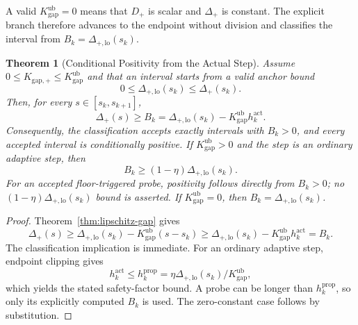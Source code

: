 \documentclass[11pt, a4paper]{article}
\newtheorem{theorem}{Theorem}[section]
\begin{document}
A valid $K_{\mathrm{gap}}^{\mathrm{ub}}=0$ means that $D_+$ is scalar and $\Delta_+$ is constant. The explicit branch therefore advances to the endpoint without division and classifies the interval from $B_k=\Delta_{+,\mathrm{lo}}(s_k)$.

\begin{theorem}[Conditional Positivity from the Actual Step]
\label{thm:continuation-positivity}
Assume $0\le K_{\mathrm{gap},+}\le K_{\mathrm{gap}}^{\mathrm{ub}}$ and that an interval starts from a valid anchor bound
\begin{equation}
0\le\Delta_{+,\mathrm{lo}}(s_k)\le\Delta_+(s_k).
\end{equation}
Then, for every $s\in[s_k,s_{k+1}]$,
\begin{equation}
\label{eq:actual-step-bound}
\Delta_+(s)\ge B_k
=\Delta_{+,\mathrm{lo}}(s_k)-K_{\mathrm{gap}}^{\mathrm{ub}}h_k^{\mathrm{act}}.
\end{equation}
Consequently, the classification accepts exactly intervals with $B_k>0$, and every accepted interval is conditionally positive. If $K_{\mathrm{gap}}^{\mathrm{ub}}>0$ and the step is an ordinary adaptive step, then
\begin{equation}
B_k\ge(1-\eta)\Delta_{+,\mathrm{lo}}(s_k).
\end{equation}
For an accepted floor-triggered probe, positivity follows directly from $B_k>0$; no $(1-\eta)\Delta_{+,\mathrm{lo}}(s_k)$ bound is asserted. If $K_{\mathrm{gap}}^{\mathrm{ub}}=0$, then $B_k=\Delta_{+,\mathrm{lo}}(s_k)$.
\end{theorem}

\begin{proof}
Theorem~\ref{thm:lipschitz-gap} gives
\begin{equation}
\Delta_+(s)\ge\Delta_{+,\mathrm{lo}}(s_k)
-K_{\mathrm{gap}}^{\mathrm{ub}}(s-s_k)
\ge\Delta_{+,\mathrm{lo}}(s_k)
-K_{\mathrm{gap}}^{\mathrm{ub}}h_k^{\mathrm{act}}=B_k.
\end{equation}
The classification implication is immediate. For an ordinary adaptive step, endpoint clipping gives
\begin{equation}
h_k^{\mathrm{act}}\le h_k^{\mathrm{prop}}
=\eta\Delta_{+,\mathrm{lo}}(s_k)/K_{\mathrm{gap}}^{\mathrm{ub}},
\end{equation}
which yields the stated safety-factor bound. A probe can be longer than $h_k^{\mathrm{prop}}$, so only its explicitly computed $B_k$ is used. The zero-constant case follows by substitution.
\end{proof}
\end{document}
